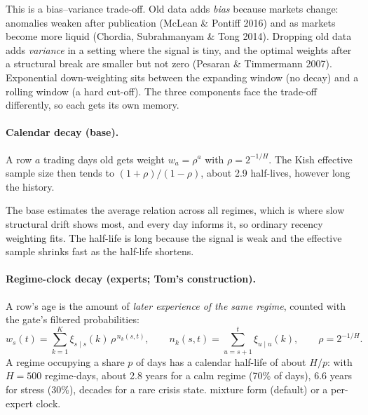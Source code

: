 \begin{whybox}
This is a bias--variance trade-off. Old data adds \emph{bias} because markets change: anomalies weaken after
publication (McLean \& Pontiff 2016) and as markets become more liquid (Chordia, Subrahmanyam \& Tong 2014).
Dropping old data adds \emph{variance} in a setting where the signal is tiny, and the optimal weights after a
structural break are smaller but not zero (Pesaran \& Timmermann 2007). Exponential down-weighting sits
between the expanding window (no decay) and a rolling window (a hard cut-off). The three components face
the trade-off differently, so each gets its own memory.
\end{whybox}

\paragraph{Calendar decay (base).} A row $a$ trading days old gets weight $w_a=\rho^{a}$ with $\rho=2^{-1/H}$.
The Kish effective sample size then tends to $(1+\rho)/(1-\rho)$, about 2.9 half-lives, however long the
history.

\begin{whybox}
The base estimates the average relation across all regimes, which is where slow structural drift shows
most, and every day informs it, so ordinary recency weighting fits. The half-life is long because the
signal is weak and the effective sample shrinks fast as the half-life shortens.
\end{whybox}

\paragraph{Regime-clock decay (experts; Tom's construction).} A row's age is the amount of \emph{later
experience of the same regime}, counted with the gate's filtered probabilities:
\begin{equation}
w_s(t)=\sum_{k=1}^{K}\xi_{s\mid s}(k)\,\rho^{\,n_k(s,t)},\qquad
n_k(s,t)=\sum_{u=s+1}^{t}\xi_{u\mid u}(k),\qquad \rho=2^{-1/H}.
\end{equation}
A regime occupying a share $p$ of days has a calendar half-life of about $H/p$: with $H=500$ regime-days,
about 2.8 years for a calm regime (70\% of days), 6.6 years for stress (30\%), decades for a rare crisis
state.  mixture form (default) or a per-expert clock.

